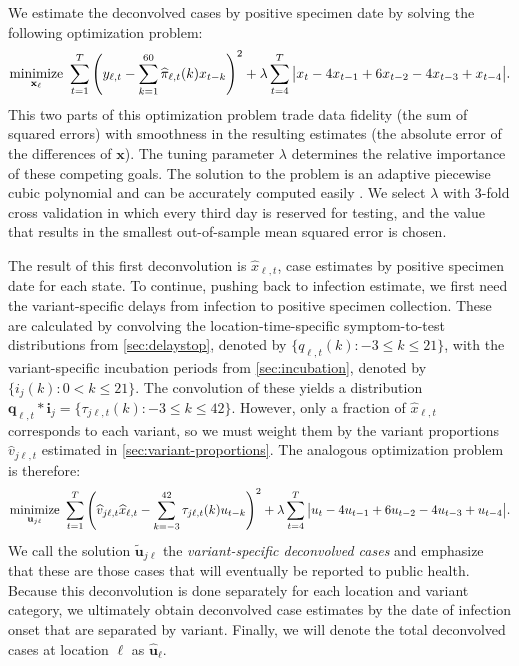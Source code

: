 \documentclass{article}
\begin{document}
We estimate the deconvolved cases by positive specimen date by solving the
following optimization problem:
\begin{align}
\operatorname*{minimize}_{\mathbf{x}_\ell}\ \sum_{t=1}^T 
\left( y_{\ell,t} -  \sum_{k=1}^{60}\widehat{\pi}_{\ell,t}(k) x_{t-k} \right)^2 
+ \lambda \sum_{t=4}^T \big|x_t - 4x_{t-1} + 6x_{t-2} -4x_{t-3}+ x_{t-4}\big|.
\end{align}
This two parts of this optimization problem trade data fidelity (the sum of
squared errors) with smoothness in the resulting estimates (the absolute error
of the differences of $\mathbf{x}$). The tuning parameter $\lambda$ determines
the relative importance of these competing goals. The solution to the problem is
an adaptive piecewise cubic polynomial \citep{tibshirani2014adaptive,
tibshirani2022divided} and can be accurately computed easily
\citep{ramdas2016fast}. We select $\lambda$ with $3$-fold cross validation
\citep{jahja2022real} in which every third day is reserved for testing, and the
value that results in the smallest out-of-sample mean squared error is chosen.

The result of this first deconvolution is $\widehat{x}_{\ell,t}$, case estimates
by positive specimen date for each state. To continue, pushing back to infection
estimate, we first need the variant-specific delays from infection to positive
specimen collection. These are calculated by convolving the
location-time-specific symptom-to-test distributions from
\autoref{sec:delaystop}, denoted by $\{q_{\ell,t}(k) : -3\leq k \leq 21\}$, with
the variant-specific incubation periods from \autoref{sec:incubation}, denoted
by $\{i_{j}(k) : 0 < k \leq 21\}$. The convolution of these yields a
distribution $\mathbf{q}_{\ell,t}*\mathbf{i}_j = \{\tau_{j\ell,t}(k): -3 \leq k
\leq 42\}$. However, only a fraction of $\widehat{x}_{\ell,t}$ corresponds to
each variant, so we must weight them by the variant proportions
$\widehat{v}_{j\ell,t}$ estimated in \autoref{sec:variant-proportions}. The
analogous optimization problem is therefore:
\begin{align}
\operatorname*{minimize}_{\mathbf{u}_{j\ell}}\ \sum_{t=1}^T 
\left( 
    \widehat{v}_{j\ell,t}\widehat{x}_{\ell,t} -  
    \sum_{k=-3}^{42} \tau_{j\ell,t}(k) u_{t-k} 
\right)^2 
+ \lambda \sum_{t=4}^T \big|u_{t} - 4u_{t-1} + 6u_{t-2} -4u_{t-3}+ u_{t-4}\big|.
\end{align}
We call the solution $\widetilde{\mathbf{u}}_{j\ell}$ the \emph{variant-specific deconvolved cases} and
emphasize that these are those cases that will eventually be reported to public
health. Because this deconvolution is done separately for each location and
variant category, we ultimately obtain deconvolved case estimates by the date of
infection onset that are separated by variant. Finally, we will denote the total
deconvolved cases at location $\ell$ as $\widehat{\mathbf{u}}_\ell$.
\end{document}
